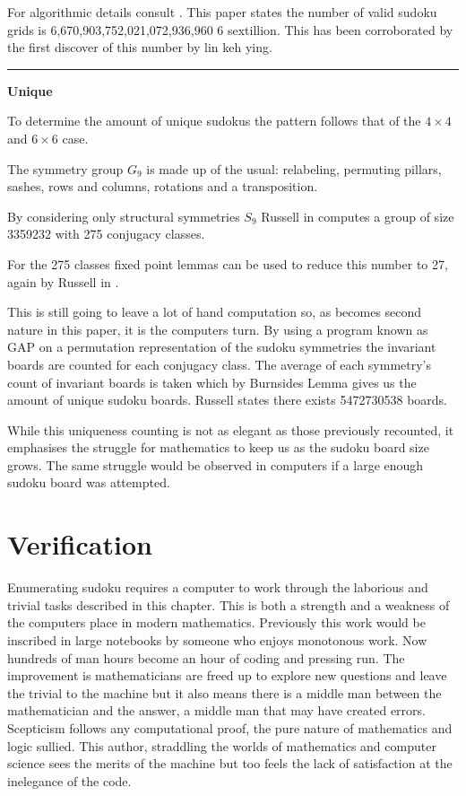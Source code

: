 \documentclass[a4paper,11pt]{report}
\newcounter{row}
\newcounter{col}
\begin{document}
{For algorithmic details consult \cite{}. This paper states the number of valid sudoku grids is 6,670,903,752,021,072,936,960 6 sextillion. This has been corroborated by the first discover of this number by \cite{} lin keh ying.
 
 \noindent\rule{4cm}{0.4pt}
 
\textbf{Unique} 

To determine the amount of unique sudokus the pattern follows that of the $4\times 4$ and $6\times 6$ case. 

The symmetry group $G_9$ is made up of the usual: relabeling, permuting pillars, sashes, rows and columns, rotations and a transposition. 

By considering only structural symmetries $S_9$ Russell in \cite{} computes a group of size 3359232 with 275 conjugacy classes. 

For the 275 classes fixed point lemmas can be used to reduce this number to 27, again by Russell in \cite{}.

This is still going to leave a lot of hand computation so, as becomes second nature in this paper, it is the computers turn. By using a program known as GAP \cite{GAP2021} on a permutation representation of the sudoku symmetries the invariant boards are counted for each conjugacy class. The average of each symmetry's count of invariant boards is taken which by Burnsides Lemma gives us the amount of unique sudoku boards. Russell states there exists 5472730538 boards. \cite{}

While this uniqueness counting is not as elegant as those previously recounted, it emphasises the struggle for mathematics to keep us as the sudoku board size grows. The same struggle would be observed in computers if a large enough sudoku board was attempted.

\section{Verification}

Enumerating sudoku requires a computer to work through the laborious and trivial tasks described in this chapter. This is both a strength and a weakness of the computers place in modern mathematics. Previously this work would be inscribed in large notebooks by someone who enjoys monotonous work. Now hundreds of man hours become an hour of coding and pressing run. The improvement is mathematicians are freed up to explore new questions and leave the trivial to the machine but it also means there is a middle man between the mathematician and the answer, a middle man that may have created errors. Scepticism follows any computational proof, the pure nature of mathematics and logic sullied. This author, straddling the worlds of mathematics and computer science sees the merits of the machine but too feels the lack of satisfaction at the inelegance of the code. 

}
\end{document}
